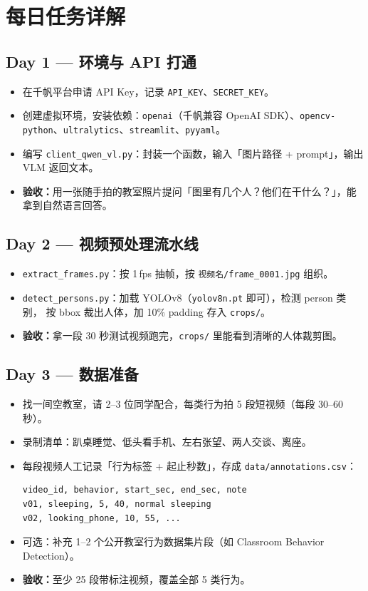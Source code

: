 \documentclass[12pt,a4paper]{ctexart}
\begin{document}
\section{每日任务详解}

\subsection*{Day 1 — 环境与 API 打通}
\begin{itemize}
  \item 在千帆平台申请 API Key，记录 \texttt{API\_KEY}、\texttt{SECRET\_KEY}。
  \item 创建虚拟环境，安装依赖：\texttt{openai}（千帆兼容 OpenAI SDK）、\texttt{opencv-python}、\texttt{ultralytics}、\texttt{streamlit}、\texttt{pyyaml}。
  \item 编写 \texttt{client\_qwen\_vl.py}：封装一个函数，输入「图片路径 + prompt」，输出 VLM 返回文本。
  \item \textbf{验收：}用一张随手拍的教室照片提问「图里有几个人？他们在干什么？」，能拿到自然语言回答。
\end{itemize}

\subsection*{Day 2 — 视频预处理流水线}
\begin{itemize}
  \item \texttt{extract\_frames.py}：按 1\,fps 抽帧，按 \texttt{视频名/frame\_0001.jpg} 组织。
  \item \texttt{detect\_persons.py}：加载 YOLOv8（\texttt{yolov8n.pt} 即可），检测 person 类别，
        按 bbox 裁出人体，加 10\% padding 存入 \texttt{crops/}。
  \item \textbf{验收：}拿一段 30 秒测试视频跑完，\texttt{crops/} 里能看到清晰的人体裁剪图。
\end{itemize}

\subsection*{Day 3 — 数据准备}
\begin{itemize}
  \item 找一间空教室，请 2--3 位同学配合，每类行为拍 5 段短视频（每段 30--60 秒）。
  \item 录制清单：趴桌睡觉、低头看手机、左右张望、两人交谈、离座。
  \item 每段视频人工记录「行为标签 + 起止秒数」，存成 \texttt{data/annotations.csv}：
  \begin{lstlisting}
video_id, behavior, start_sec, end_sec, note
v01, sleeping, 5, 40, normal sleeping
v02, looking_phone, 10, 55, ...
  \end{lstlisting}
  \item 可选：补充 1--2 个公开教室行为数据集片段（如 Classroom Behavior Detection）。
  \item \textbf{验收：}至少 25 段带标注视频，覆盖全部 5 类行为。
\end{itemize}
\end{document}
